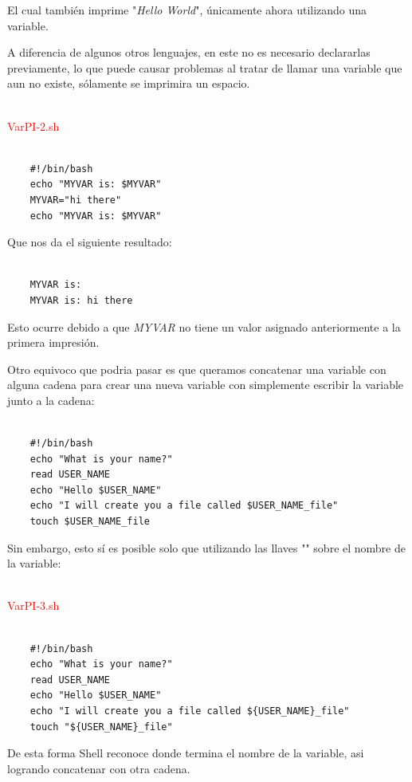 \documentclass{article}
\begin{document}
El cual también imprime "\textit{Hello World}", únicamente ahora utilizando una variable.

A diferencia de algunos otros lenguajes, en este no es necesario declararlas previamente, lo que puede causar problemas al tratar de llamar una variable que aun no existe, sólamente se imprimira un espacio. 

~\\
\textcolor{red}{VarPI-2.sh}
\begin{framed}
\begin{verbatim}
	
    #!/bin/bash
    echo "MYVAR is: $MYVAR"
    MYVAR="hi there"
    echo "MYVAR is: $MYVAR"
\end{verbatim}
\end{framed}

Que nos da el siguiente resultado:
\begin{verbatim}
	
    MYVAR is:
    MYVAR is: hi there
\end{verbatim}

Esto ocurre debido a que \textit{MYVAR} no tiene un valor asignado anteriormente a la primera impresión.

Otro equivoco que podria pasar es que queramos concatenar una variable con alguna cadena para crear una nueva variable con simplemente escribir la variable junto a la cadena:
\begin{verbatim}
	
    #!/bin/bash
    echo "What is your name?"
    read USER_NAME
    echo "Hello $USER_NAME"
    echo "I will create you a file called $USER_NAME_file"
    touch $USER_NAME_file
\end{verbatim}

Sin embargo, esto sí es posible solo que utilizando las llaves "{}" sobre el nombre de la variable:

~\\
\textcolor{red}{VarPI-3.sh}
\begin{framed}
\begin{verbatim}
	
    #!/bin/bash
    echo "What is your name?"
    read USER_NAME
    echo "Hello $USER_NAME"
    echo "I will create you a file called ${USER_NAME}_file"
    touch "${USER_NAME}_file"
\end{verbatim}
\end{framed}

De esta forma Shell reconoce donde termina el nombre de la variable, asi logrando concatenar con otra cadena.
\end{document}
